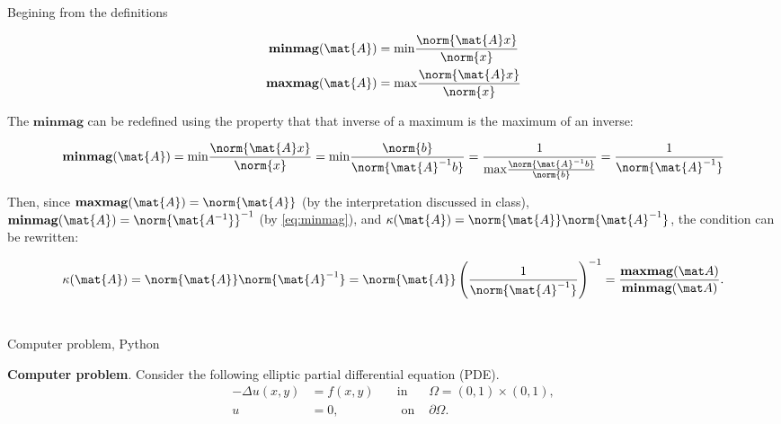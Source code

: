 \documentclass{template}
\newcommand{\maxmag}{\mathrm{\mathbf{maxmag}}}
\newcommand{\minmag}{\mathrm{\mathbf{minmag}}}
\begin{document}
Begining from the definitions

\begin{equation}
    \begin{split}
        \minmag(\mat{A}) & = \text{min}\frac{\norm{\mat{A}x}}{\norm{x}}\\
        \maxmag(\mat{A}) & = \text{max}\frac{\norm{\mat{A}x}}{\norm{x}}
    \end{split}
\end{equation}

The $\minmag$ can be redefined using the property that that inverse of a maximum is the maximum of an inverse:

\begin{equation}\label{eq:minmag}
    \minmag(\mat{A}) = \text{min}\frac{\norm{\mat{A}x}}{\norm{x}} = \text{min}\frac{\norm{b}}{\norm{\mat{A}^{-1}b}} = \frac{1}{\text{max}\frac{\norm{\mat{A}^{-1}b}}{\norm{b}}} = \frac{1}{\norm{\mat{A}^{-1}}}
\end{equation}

Then, since $\maxmag(\mat{A}) = \norm{\mat{A}}$ (by the interpretation discussed in class), $\minmag(\mat{A}) = \norm{\mat{A^{-1}}}^{-1}$ (by \autoref{eq:minmag}), and $\kappa (\mat{A}) = \norm{\mat{A}}\norm{\mat{A}^{-1}}$, the condition can be rewritten:

\begin{equation}
    \kappa (\mat{A}) = \norm{\mat{A}}\norm{\mat{A}^{-1}} = \norm{\mat{A}} \left( \frac{1}{\norm{\mat{A}^{-1}}}\right)^{-1} = \frac{\maxmag(\mat A)}{\minmag(\mat A)}.
\end{equation}


\section{} Computer problem, Python

\textbf{Computer problem}. Consider the following elliptic partial differential equation (PDE). 
\begin{equation}\label{equ:poisson}
\begin{alignedat}{2}
-\Delta u(x, y) &= f(x, y) \quad &\text{in } &\Omega = (0, 1) \times (0, 1),\\
        u       &= 0,      \quad &\text{ on } &\partial \Omega.
\end{alignedat}
\end{equation}

\subsection{}
\end{document}
